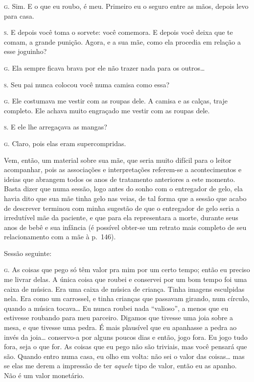 \noindent\hskip0mm\textsc{g.} Sim. E o que eu roubo, é meu. Primeiro eu o seguro entre as mãos,
depois levo para casa.

\noindent\hskip0mm\textsc{s.} E depois você toma o sorvete: você comemora. E depois você deixa que
te comam, a grande punição. Agora, e a sua mãe, como ela procedia em
relação a esse joguinho?

\noindent\hskip0mm\textsc{g.} Ela sempre ficava brava por ele não trazer nada para os outros\ldots{}

\noindent\hskip0mm\textsc{s.} Seu pai nunca colocou você numa camisa como essa?

\noindent\hskip0mm\textsc{g.} Ele costumava me vestir com as roupas dele. A camisa e as calças,
traje completo. Ele achava muito engraçado me vestir com as roupas
dele.

\noindent\hskip0mm\textsc{s.} E ele lhe arregaçava as mangas?

\noindent\hskip0mm\textsc{g.} Claro, pois elas eram supercompridas.

\bigskip

Vem, então, um material sobre sua mãe, que seria muito difícil para
o leitor acompanhar, pois as associações e interpretações referem-se a
acontecimentos e ideias que abrangem todos os anos de tratamento
anteriores a este momento. Basta dizer que numa sessão, logo antes do
sonho com o entregador de gelo, ela havia dito que sua mãe tinha gelo
nas veias, de tal forma que a sessão que acabo de descrever terminou
com minha sugestão de que o entregador de gelo seria a irredutível mãe
da paciente, e que para ela representara a morte, durante seus anos de
bebê e sua infância (é possível obter-se um retrato mais completo de
seu relacionamento com a mãe à p.~146).

Sessão seguinte:

\bigskip

\noindent\hskip0mm\textsc{g.} As coisas que pego só têm valor pra mim por um certo tempo; então eu
preciso me livrar delas. A única coisa que roubei e conservei por um
bom tempo foi uma caixa de música. Era uma caixa de música de criança.
Tinha imagens esculpidas nela. Era como um carrossel, e tinha crianças
que passavam girando, num círculo, quando a música tocava\ldots{} Eu nunca
roubei nada ``valioso'', a menos que eu
estivesse roubando para meu parceiro. Digamos que tivesse uma joia
sobre a mesa, e que tivesse uma pedra. É mais plausível que eu
apanhasse a pedra ao invés da joia\ldots{} conservo-a por alguns poucos dias
e então, jogo fora. Eu jogo tudo fora, seja o que for. As coisas que eu
pego não são triviais, mas você pensará que são. Quando entro numa
casa, eu olho em volta: não sei o valor das coisas\ldots{} mas se elas me
derem a impressão de ter \textit{aquele} tipo de valor, então eu as
apanho. Não é um valor monetário.

